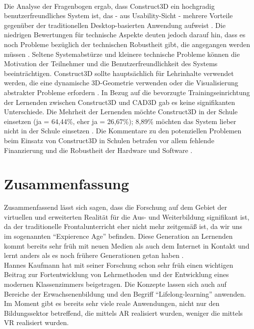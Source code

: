 \documentclass[deutsch]{llncs}
\begin{document}
\noindent \\
Die Analyse der Fragenbogen ergab, dass Construct3D ein hochgradig benutzerfreundliches System ist, das - aus Usability-Sicht - mehrere Vorteile gegenüber der traditionellen Desktop-basierten Anwendung aufweist \cite{Kaufmann_summaryof}. Die niedrigen Bewertungen für technische Aspekte deuten jedoch darauf hin, dass es noch Probleme bezüglich der technischen Robustheit gibt, die angegangen werden müssen \cite{Kaufmann_summaryof}. Seltene Systemabstürze und kleinere technische Probleme können die Motivation der Teilnehmer und die Benutzerfreundlichkeit des Systems beeinträchtigen. Construct3D sollte hauptsächlich für Lehrinhalte verwendet werden, die eine dynamische 3D-Geometrie verwenden oder die Visualisierung abstrakter Probleme erfordern \cite{Kaufmann_summaryof}. In Bezug auf die bevorzugte Trainingseinrichtung der Lernenden zwischen Construct3D und CAD3D gab es keine signifikanten Unterschiede. Die Mehrheit der Lernenden möchte Construct3D in der Schule einsetzen (ja = 64,44\%, eher ja = 26,67\%); 8,89\% möchten das System lieber nicht in der Schule einsetzen \cite{Kaufmann_summaryof}.  Die Kommentare zu den potenziellen Problemen beim Einsatz von Construct3D in Schulen betrafen vor allem fehlende Finanzierung und die Robustheit der Hardware und Software \cite{Kaufmann_summaryof}.\\

\section{Zusammenfassung}
Zusammenfassend lässt sich sagen, dass die Forschung auf dem Gebiet der virtuellen und erweiterten Realität für die Aus- und Weiterbildung signifikant ist, da der traditionelle Frontalunterricht eher nicht mehr zeitgemäß ist, da wir uns im sogenannten ``Expierence Age'' befinden. Diese Generation an Lernenden kommt bereits sehr früh mit neuen Medien als auch dem Internet in Kontakt und lernt anders als es noch frühere Generationen getan haben \cite{Hu-Au}. \\
Hannes Kaufmann hat mit seiner Forschung schon sehr früh einen wichtigen Beitrag zur Fortentwicklung von Lehrmethoden und der Entwicklung eines modernen Klassenzimmers beigetragen. 
Die Konzepte lassen sich auch auf Bereiche der Erwachsenenbildung und den Begriff ``Lifelong-learning'' anwenden. \\
Im Moment gibt es bereits sehr viele reale Anwendungen, nicht nur den Bildungssektor betreffend, die mittels AR realisiert wurden, weniger die mittels VR realisiert wurden. 

\label{sec:bib}

\printbibliography
\end{document}
